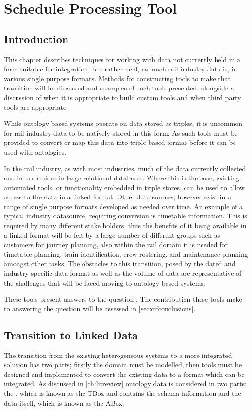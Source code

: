 \chapter{Schedule Processing Tool}\label{ch:cifparser}
 \section{Introduction}
This chapter describes techniques for working with data not currently held in a form suitable for integration, but rather held, as much rail industry data is, in various single purpose formats. Methods for constructing tools to make that transition will be discussed and examples of such tools presented, alongside a discussion of when it is appropriate to build custom tools and when third party tools are appropriate. 

While ontology based systems operate on data stored as triples, it is uncommon for rail industry data to be natively stored in this form. As such tools must be provided to convert or map this data into triple based format before it can be used with ontologies. 

In the rail industry, as with most industries, much of the data currently collected and in use resides in large relational databases. Where this is the case, existing automated tools, or functionality embedded in triple stores, can be used to allow access to the data in a linked format. Other data sources, however exist in a range of single purpose formats developed as needed over time. An example of a typical industry datasource, requiring conversion is timetable information. This is required by many different stake holders, thus the benefits of it being available in a linked format will be felt by a large number of different groups such as customers for journey planning, also within the rail domain it is needed for timetable planning, train identification, crew rostering, and maintenance planning amongst other tasks. The obstacles to this transition, posed by the dated and industry specific data format as well as the volume of data are representative of the challenges that will be faced moving to ontology based systems. 

These tools present answers to the question \textit{\QuestionOtherData}. The contribution these tools make to answering the question will be assessed in \autoref{sec:cifconclusions}.

\section{Transition to Linked Data}
The transition from the existing heterogeneous systems to a more integrated solution has two parts; firstly the domain must be modelled, then tools must be designed and implemented to convert the existing data to a format which can be integrated. As discussed in \autoref{ch:litreview} ontology data is considered in two parts: the , which is known as the TBox and contains the schema information and the data itself, which is known as the ABox. 

